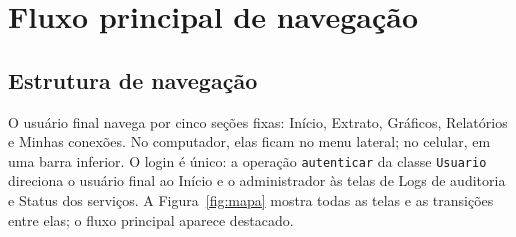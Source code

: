 \documentclass[11pt,a4paper]{article}
\newcommand{\cls}[1]{\texttt{#1}}
\begin{document}
\section{Fluxo principal de navegação}

\subsection{Estrutura de navegação}

O usuário final navega por cinco seções fixas: Início, Extrato, Gráficos, Relatórios e Minhas conexões. No computador, elas ficam no menu lateral; no celular, em uma barra inferior. O login é único: a operação \cls{autenticar} da classe \cls{Usuario} direciona o usuário final ao Início e o administrador às telas de Logs de auditoria e Status dos serviços. A Figura~\ref{fig:mapa} mostra todas as telas e as transições entre elas; o fluxo principal aparece destacado.
\end{document}

